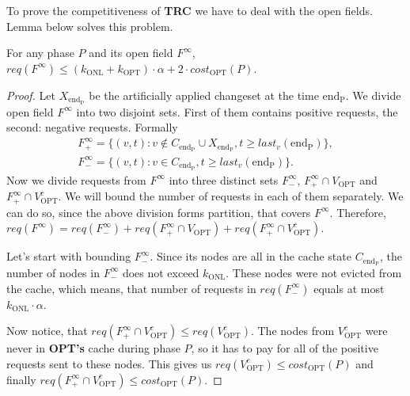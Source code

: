 
To prove the competitiveness of \textbf{TRC} we have to deal with the open
fields. Lemma below solves this problem.
\begin{lemma} For any phase $P$ and
its open field $F^{\infty}$, $req(F^{\infty}) \leq (k_{\mathrm{ONL}} +
k_{\mathrm{OPT}}) \cdot \alpha + 2 \cdot cost_{\mathrm{OPT}}(P)$.
\label{thm:inifinite_filed_bound}
\end{lemma}
\begin{proof} Let
$X_{\mathrm{end_P}}$ be the artificially applied changeset at the time
$\mathrm{end_P}$. We divide open field $F^{\infty}$ into two disjoint sets.
First of them contains positive requests, the second: negative requests. Formally
\begin{gather*} F^{\infty}_{+} = \{(v, t): v \notin C_{\mathrm{end_P}} \cup
X_{\mathrm{end_P}}, t \geq last_v(\mathrm{end_P})\}, \\ F^{\infty}_{-} = \{(v,
t): v \in C_{\mathrm{end_P}}, t \geq last_v(\mathrm{end_P})\}.  \end{gather*}
Now we divide requests from $F^{\infty}$ into three distinct sets
$F^{\infty}_{-}$, $F^{\infty}_{+} \cap V_{\mathrm{OPT}}$ and $F^{\infty}_{+}
\cap V_{\mathrm{OPT}}^c$. We will bound the number of requests in each of them
separately. We can do so, since the above division forms partition, that covers
$F^{\infty}$. Therefore, $req(F^{\infty}) = req(F^{\infty}_{-}) +
req(F^{\infty}_{+} \cap V_{\mathrm{OPT}}) + req(F^{\infty}_{+} \cap
V_{\mathrm{OPT}}^c)$.

Let's start with bounding $F^{\infty}_{-}$. Since its nodes are all in the cache
state $C_{\mathrm{end_P}}$, the number of nodes in $F^{\infty}_{-}$ does not
exceed $k_{\mathrm{ONL}}$. These nodes were not evicted from the cache, which
means, that number of requests in $req(F^{\infty}_{-})$ equals at most
$k_{\mathrm{ONL}} \cdot \alpha$.

Now notice, that $req(F^{\infty}_{+} \cap V_{\mathrm{OPT}}^c) \leq
req(V_{\mathrm{OPT}}^c)$. The nodes from $V_{\mathrm{OPT}}^c$ were never in
\textbf{OPT's} cache during phase $P$, so it has to pay for all of the positive
requests sent to these nodes. This gives us $req(V_{\mathrm{OPT}}^c) \leq
cost_{\mathrm{OPT}}(P)$ and finally $req(F^{\infty}_{+} \cap V_{\mathrm{OPT}}^c)
\leq cost_{\mathrm{OPT}}(P)$.


\end{proof}
